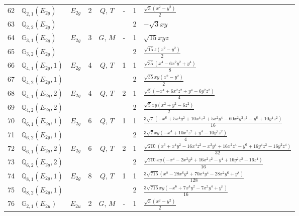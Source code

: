 \documentclass[fleqn,10pt,landscape]{jsarticle}
\begin{document}
\begin{longtable}[l]{clcccccl}
62 & $\mathbb{Q}_{2,1}(E_{2g})$ & $E_{2g}$ & 2 & $Q$, $T$ & - & 1 & $\frac{\sqrt{3} \left(x^{2} - y^{2}\right)}{2}$ \\
63 & $\mathbb{Q}_{2,2}(E_{2g})$ &  &  &  &  & 2 & $- \sqrt{3} x y$ \\ \hline
64 & $\mathbb{G}_{3,1}(E_{2g})$ & $E_{2g}$ & 3 & $G$, $M$ & - & 1 & $\sqrt{15} x y z$ \\
65 & $\mathbb{G}_{3,2}(E_{2g})$ &  &  &  &  & 2 & $\frac{\sqrt{15} z \left(x^{2} - y^{2}\right)}{2}$ \\ \hline
66 & $\mathbb{Q}_{4,1}(E_{2g},1)$ & $E_{2g}$ & 4 & $Q$, $T$ & 1 & 1 & $\frac{\sqrt{35} \left(x^{4} - 6 x^{2} y^{2} + y^{4}\right)}{8}$ \\
67 & $\mathbb{Q}_{4,2}(E_{2g},1)$ &  &  &  &  & 2 & $\frac{\sqrt{35} x y \left(x^{2} - y^{2}\right)}{2}$ \\ \hline
68 & $\mathbb{Q}_{4,1}(E_{2g},2)$ & $E_{2g}$ & 4 & $Q$, $T$ & 2 & 1 & $\frac{\sqrt{5} \left(- x^{4} + 6 x^{2} z^{2} + y^{4} - 6 y^{2} z^{2}\right)}{4}$ \\
69 & $\mathbb{Q}_{4,2}(E_{2g},2)$ &  &  &  &  & 2 & $\frac{\sqrt{5} x y \left(x^{2} + y^{2} - 6 z^{2}\right)}{2}$ \\ \hline
70 & $\mathbb{Q}_{6,1}(E_{2g},1)$ & $E_{2g}$ & 6 & $Q$, $T$ & 1 & 1 & $\frac{3 \sqrt{7} \left(- x^{6} + 5 x^{4} y^{2} + 10 x^{4} z^{2} + 5 x^{2} y^{4} - 60 x^{2} y^{2} z^{2} - y^{6} + 10 y^{4} z^{2}\right)}{16}$ \\
71 & $\mathbb{Q}_{6,2}(E_{2g},1)$ &  &  &  &  & 2 & $\frac{3 \sqrt{7} x y \left(- x^{4} + 10 x^{2} z^{2} + y^{4} - 10 y^{2} z^{2}\right)}{4}$ \\ \hline
72 & $\mathbb{Q}_{6,1}(E_{2g},2)$ & $E_{2g}$ & 6 & $Q$, $T$ & 2 & 1 & $\frac{\sqrt{210} \left(x^{6} + x^{4} y^{2} - 16 x^{4} z^{2} - x^{2} y^{4} + 16 x^{2} z^{4} - y^{6} + 16 y^{4} z^{2} - 16 y^{2} z^{4}\right)}{32}$ \\
73 & $\mathbb{Q}_{6,2}(E_{2g},2)$ &  &  &  &  & 2 & $\frac{\sqrt{210} x y \left(- x^{4} - 2 x^{2} y^{2} + 16 x^{2} z^{2} - y^{4} + 16 y^{2} z^{2} - 16 z^{4}\right)}{16}$ \\ \hline
74 & $\mathbb{Q}_{8,1}(E_{2g},1)$ & $E_{2g}$ & 8 & $Q$, $T$ & 1 & 1 & $\frac{3 \sqrt{715} \left(x^{8} - 28 x^{6} y^{2} + 70 x^{4} y^{4} - 28 x^{2} y^{6} + y^{8}\right)}{128}$ \\
75 & $\mathbb{Q}_{8,2}(E_{2g},1)$ &  &  &  &  & 2 & $\frac{3 \sqrt{715} x y \left(- x^{6} + 7 x^{4} y^{2} - 7 x^{2} y^{4} + y^{6}\right)}{16}$ \\ \hline
76 & $\mathbb{G}_{2,1}(E_{2u})$ & $E_{2u}$ & 2 & $G$, $M$ & - & 1 & $\frac{\sqrt{3} \left(x^{2} - y^{2}\right)}{2}$ \\

\end{longtable}
\end{document}
